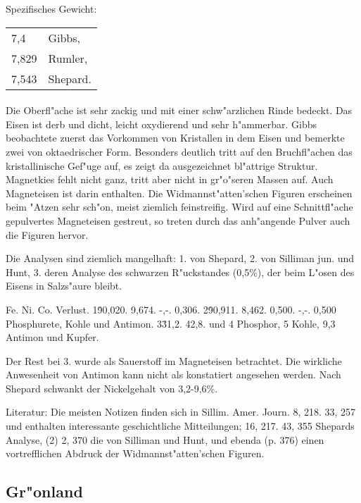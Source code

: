 \documentclass[a4paper, 11pt, oneside]{article}
\begin{document}
Spezifisches Gewicht:  
\begin{table}[!ht]
    \centering
    \begin{tabular}{l l}
        7,4 & Gibbs,\\
        7,829 & Rumler,\\
        7,543 & Shepard.
    \end{tabular}
\end{table}
\paragraph{}
Die Oberfl"ache ist sehr zackig und mit einer schw"arzlichen Rinde bedeckt. Das Eisen ist derb und dicht, leicht oxydierend und sehr h"ammerbar. Gibbs beobachtete zuerst das Vorkommen von Kristallen in dem Eisen und bemerkte zwei von oktaedrischer Form. Besonders deutlich tritt auf den Bruchfl"achen das kristallinische Gef"uge auf, es zeigt da ausgezeichnet bl"attrige Struktur. Magnetkies fehlt nicht ganz, tritt aber nicht in gr"o"seren Massen auf. Auch Magneteisen ist darin enthalten. Die Widmannst"atten'schen Figuren erscheinen beim "Atzen sehr sch"on, meist ziemlich feinstreifig. Wird auf eine Schnittfl"ache gepulvertes Magneteisen gestreut, so treten durch das anh"angende Pulver auch die Figuren hervor.

Die Analysen sind ziemlich mangelhaft: 1. von Shepard, 2. von Silliman jun. und Hunt, 3. deren Analyse des schwarzen R"uckstandes (0,5\%), der beim L"osen des Eisens in Salzs"aure bleibt.

Fe. Ni. Co. Verlust.  
1\. 90,020. 9,674. -,-. 0,306.  
2\. 90,911. 8,462. 0,500. -,-. 0,500 Phosphurete, Kohle und Antimon.  
3\. 31,2. 42,8. und 4 Phosphor, 5 Kohle, 9,3 Antimon und Kupfer.

Der Rest bei 3. wurde als Sauerstoff im Magneteisen betrachtet. Die wirkliche Anwesenheit von Antimon kann nicht als konstatiert angesehen werden. Nach Shepard schwankt der Nickelgehalt von 3,2-9,6\%.

Literatur: Die meisten Notizen finden sich in Sillim. Amer. Journ. 8, 218. 33, 257 und enthalten interessante geschichtliche Mitteilungen; 16, 217. 43, 355 Shepards Analyse, (2) 2, 370 die von Silliman und Hunt, und ebenda (p. 376) einen vortrefflichen Abdruck der Widmannst"atten'schen Figuren.

\subsection{Gr"onland}
\end{document}
